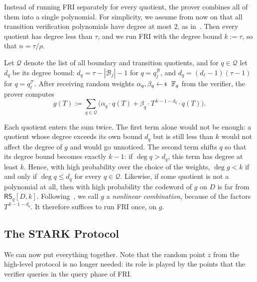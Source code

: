 \documentclass[../../book]{subfiles}
\begin{document}
Instead of running FRI separately for every quotient, the prover combines all of them into a single polynomial. For simplicity, we assume from now on that all transition verification polynomials have degree at most $2$, as in~\cite{szepieniec2021anatomy}. Then every quotient has degree less than $\tau$, and we run FRI with the degree bound $k := \tau$, so that $n = \tau/\rho$.

Let $\mathcal{Q}$ denote the list of all boundary and transition quotients, and for $q \in \mathcal{Q}$ let $d_q$ be its degree bound: $d_q = \tau - |\mathcal{B}_j| - 1$ for $q = q^{\mathcal{B}}_j$, and $d_q = (d_\ell - 1)(\tau - 1)$ for $q = q^{\mathcal{T}}_\ell$. After receiving random weights $\alpha_q, \beta_q \leftarrowS \mathbb{F}_q$ from the verifier, the prover computes
\begin{equation*}
  g(T) := \sum_{q \in \mathcal{Q}} \big( \alpha_q \cdot q(T) + \beta_q \cdot T^{\,k-1-d_q} \cdot q(T) \big).
\end{equation*}

Each quotient enters the sum twice. The first term alone would not be enough: a quotient whose degree exceeds its own bound $d_q$ but is still less than $k$ would not affect the degree of $g$ and would go unnoticed. The second term shifts $q$ so that its degree bound becomes exactly $k-1$: if $\deg q > d_q$, this term has degree at least $k$. Hence, with high probability over the choice of the weights, $\deg g < k$ if and only if $\deg q \leq d_q$ for every $q \in \mathcal{Q}$. Likewise, if some quotient is not a polynomial at all, then with high probability the codeword of $g$ on $D$ is far from $\mathsf{RS}_q[D,k]$. Following~\cite{szepieniec2021anatomy}, we call $g$ a \emph{nonlinear combination}, because of the factors $T^{\,k-1-d_q}$. It therefore suffices to run FRI once, on $g$.

\subsection{The STARK Protocol}\label{subsec:stark-protocol}

We can now put everything together. Note that the random point $z$ from the high-level protocol is no
longer needed: its role is played by the points that the verifier queries in the query phase of FRI.
\end{document}

